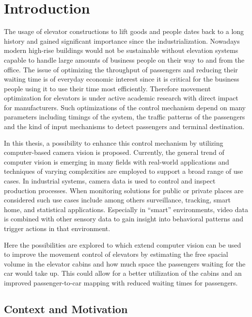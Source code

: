 \chapter{Introduction}
\label{chap:intro}

The usage of elevator constructions to lift goods and people dates back to a long history and gained significant importance since the industrialization.
Nowadays modern high-rise buildings would not be sustainable without elevation systems capable to handle large amounts of business people on their way to and from the office. 
The issue of optimizing the throughput of passengers and reducing their waiting time is of everyday economic interest since it is critical for the business people using it to use their time most efficiently. 
Therefore movement optimization for elevators is under active academic research with direct impact for manufacturers.
Such optimizations of the control mechanism depend on many parameters including timings of the system, the traffic patterns of the passengers and the kind of input mechanisms to detect passengers and terminal destination.

In this thesis, a possibility to enhance this control mechanism by utilizing computer-based camera vision is proposed.
Currently, the general trend of computer vision is emerging in many fields with real-world applications
and techniques of varying complexities are employed to support a broad range of use cases. 
In industrial systems, camera data is used to control and inspect production processes. 
When monitoring solutions for public or private places are considered such use cases include among others surveillance, tracking,
smart home, and statistical applications.
Especially in \enquote{smart} environments, video data is combined with other sensory data to gain insight into behavioral patterns and trigger actions in that environment.

Here the possibilities are explored to which extend
computer vision can be used to improve the movement control of elevators by estimating the free spacial volume in the elevator cabins and how much space the passengers waiting for the car would take up.
This could allow for a better utilization of the cabins and an improved passenger-to-car mapping with reduced waiting times for passengers.

\section{Context and Motivation}
\label{sec:into:context}

